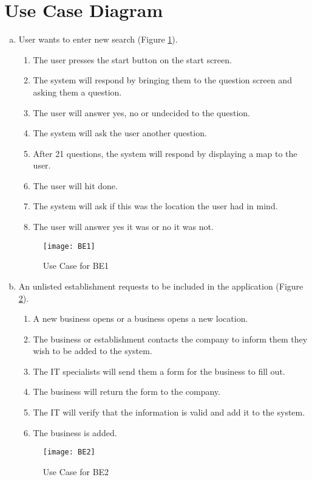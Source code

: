 \documentclass[titlepage]{article}
\begin{document}
\section{Use Case Diagram}
\label{sec:use_case_diagram}
\begin{enumerate}[a)]
	\item User wants to enter new search (Figure \ref{usecase:search}).
		\begin{enumerate}[{BE1}.1]
			\item The user presses the start button on the start screen.
			\item The system will respond by bringing them to the question screen and asking them a question.
			\item The user will answer yes, no or undecided to the question.
			\item The system will ask the user another question.
			\item After 21 questions, the system will respond by displaying a map to the user.
			\item The user will hit done.
			\item The system will ask if this was the location the user had in mind.
			\item The user will answer yes it was or no it was not.
		\end{enumerate}
	\begin{center}
		\begin{figure}[H]
			\texttt{[image: BE1]}
			\caption{Use Case for BE1}\label{usecase:search}
		\end{figure}
	\end{center}

	\item An unlisted establishment requests to be included in the application (Figure \ref{usecase:new_esta}).
		\begin{enumerate}[{BE2}.1]
			\item A new business opens or a business opens a new location.
			\item The business or establishment contacts the company to inform them they wish to be added to the system.
			\item The IT specialists will send them a form for the business to fill out.
			\item The business will return the form to the company.
			\item The IT will verify that the information is valid and add it to the system.
			\item The business is added.
		\end{enumerate}
	\begin{center}
		\begin{figure}[H]
			\texttt{[image: BE2]}
			\caption{Use Case for BE2}\label{usecase:new_esta}
		\end{figure}
	\end{center}



\end{enumerate}
\end{document}
